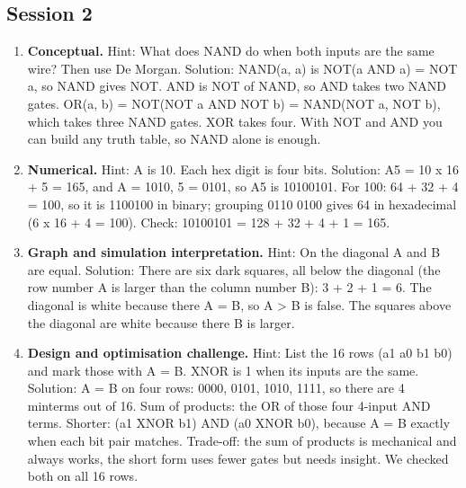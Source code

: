 \documentclass[11pt,a4paper]{article}
\begin{document}
\subsection*{Session 2}
\begin{enumerate}[nosep]
\item \textbf{Conceptual.} Hint: What does NAND do when both inputs are the same wire? Then use De Morgan. Solution: NAND(a, a) is NOT(a AND a) = NOT a, so NAND gives NOT. AND is NOT of NAND, so AND takes two NAND gates. OR(a, b) = NOT(NOT a AND NOT b) = NAND(NOT a, NOT b), which takes three NAND gates. XOR takes four. With NOT and AND you can build any truth table, so NAND alone is enough.
\item \textbf{Numerical.} Hint: A is 10. Each hex digit is four bits. Solution: A5 = 10 x 16 + 5 = 165, and A = 1010, 5 = 0101, so A5 is 10100101. For 100: 64 + 32 + 4 = 100, so it is 1100100 in binary; grouping 0110 0100 gives 64 in hexadecimal (6 x 16 + 4 = 100). Check: 10100101 = 128 + 32 + 4 + 1 = 165.
\item \textbf{Graph and simulation interpretation.} Hint: On the diagonal A and B are equal. Solution: There are six dark squares, all below the diagonal (the row number A is larger than the column number B): 3 + 2 + 1 = 6. The diagonal is white because there A = B, so A \textgreater{} B is false. The squares above the diagonal are white because there B is larger.
\item \textbf{Design and optimisation challenge.} Hint: List the 16 rows (a1 a0 b1 b0) and mark those with A = B. XNOR is 1 when its inputs are the same. Solution: A = B on four rows: 0000, 0101, 1010, 1111, so there are 4 minterms out of 16. Sum of products: the OR of those four 4-input AND terms. Shorter: (a1 XNOR b1) AND (a0 XNOR b0), because A = B exactly when each bit pair matches. Trade-off: the sum of products is mechanical and always works, the short form uses fewer gates but needs insight. We checked both on all 16 rows.
\end{enumerate}
\end{document}
